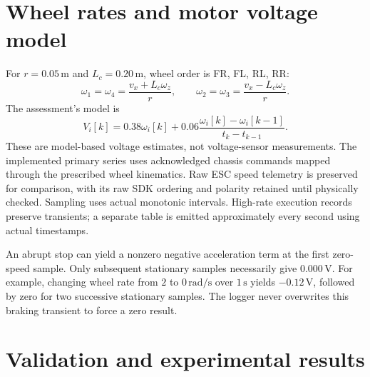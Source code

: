 \documentclass[11pt,a4paper]{article}
\begin{document}
\section{Wheel rates and motor voltage model}
For $r=0.05\,\mathrm{m}$ and $L_c=0.20\,\mathrm{m}$, wheel order is FR, FL, RL, RR:
\begin{equation}
 \omega_1=\omega_4=\frac{v_x+L_c\omega_z}{r},\qquad
 \omega_2=\omega_3=\frac{v_x-L_c\omega_z}{r}.
\end{equation}
The assessment's model is
\begin{equation}
 V_i[k]=0.38\omega_i[k]+0.06\frac{\omega_i[k]-\omega_i[k-1]}{t_k-t_{k-1}}.
\end{equation}
These are model-based voltage estimates, not voltage-sensor measurements. The implemented primary series uses acknowledged chassis commands mapped through the prescribed wheel kinematics. Raw ESC speed telemetry is preserved for comparison, with its raw SDK ordering and polarity retained until physically checked. Sampling uses actual monotonic intervals. High-rate execution records preserve transients; a separate table is emitted approximately every second using actual timestamps.

An abrupt stop can yield a nonzero negative acceleration term at the first zero-speed sample. Only subsequent stationary samples necessarily give $0.000\,\mathrm{V}$. For example, changing wheel rate from $2$ to $0\,\mathrm{rad/s}$ over $1\,\mathrm{s}$ yields $-0.12\,\mathrm{V}$, followed by zero for two successive stationary samples. The logger never overwrites this braking transient to force a zero result.

\section{Validation and experimental results}
\end{document}
